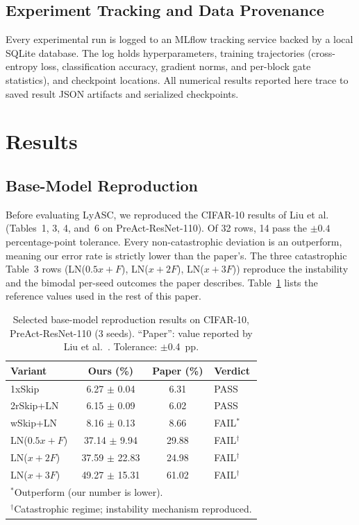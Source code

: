 \documentclass[conference,10pt]{IEEEtran}
\begin{document}
\subsection{Experiment Tracking and Data Provenance}

Every experimental run is logged to an MLflow tracking service backed by
a local SQLite database. The log holds hyperparameters, training trajectories
(cross-entropy loss, classification accuracy, gradient norms, and per-block
gate statistics), and checkpoint locations. All numerical results reported
here trace to saved result JSON artifacts and serialized checkpoints.



\section{Results}

\subsection{Base-Model Reproduction}
\label{sec:reproduction}

Before evaluating LyASC, we reproduced the CIFAR-10 results of
Liu et al.~\cite{liu2021rethinking} (Tables~1, 3, 4, and~6 on
PreAct-ResNet-110). Of 32 rows, 14 pass the $\pm 0.4$
percentage-point tolerance. Every non-catastrophic deviation is an
outperform, meaning our error rate is strictly lower than the paper's.
The three catastrophic Table~3 rows (LN($0.5x + F$), LN($x + 2F$),
LN($x + 3F$)) reproduce the instability and the bimodal per-seed
outcomes the paper describes. Table~\ref{tab:baselines} lists the
reference values used in the rest of this paper.

\begin{table}[t]
\centering
\caption{Selected base-model reproduction results on CIFAR-10,
PreAct-ResNet-110 (3 seeds). ``Paper'': value reported by
Liu et al.~\cite{liu2021rethinking}. Tolerance: $\pm$0.4~pp.}
\label{tab:baselines}
\begin{tabular}{lccl}
\toprule
Variant & Ours (\%) & Paper (\%) & Verdict \\
\midrule
1xSkip        & 6.27 $\pm$ 0.04 & 6.31  & PASS \\
2rSkip+LN     & 6.15 $\pm$ 0.09 & 6.02  & PASS \\
wSkip+LN      & 8.16 $\pm$ 0.13 & 8.66  & FAIL$^*$ \\
\midrule
LN($0.5x+F$) & 37.14 $\pm$ 9.94  & 29.88 & FAIL$^\dagger$ \\
LN($x+2F$)   & 37.59 $\pm$ 22.83 & 24.98 & FAIL$^\dagger$ \\
LN($x+3F$)   & 49.27 $\pm$ 15.31 & 61.02 & FAIL$^\dagger$ \\
\bottomrule
\multicolumn{4}{l}{\footnotesize $^*$Outperform (our number is lower).} \\
\multicolumn{4}{l}{\footnotesize $^\dagger$Catastrophic regime;
instability mechanism reproduced.}
\end{tabular}
\end{table}
\end{document}
